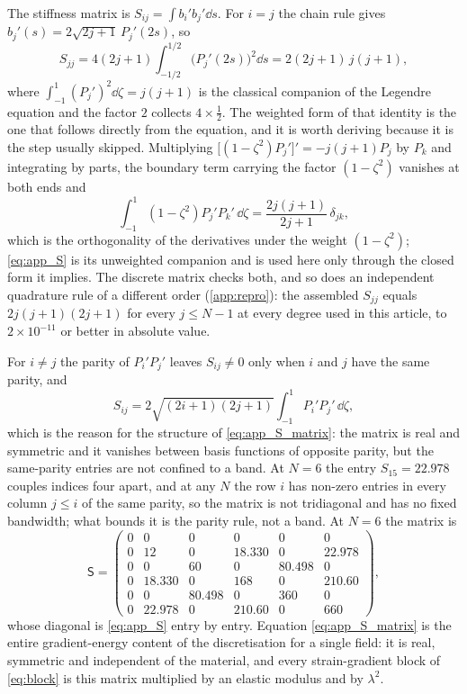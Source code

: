 The stiffness matrix is $S_{ij}=\int b_i'b_j'\dd s$.  For $i=j$ the chain rule
gives $b_j'(s)=2\sqrt{2j+1}\,P_j'(2s)$, so
\begin{equation}
\label{eq:app_S}
S_{jj}=4(2j+1)\int_{-1/2}^{1/2}\bigl(P_j'(2s)\bigr)^{2}\dd s
=2(2j+1)\,j(j+1),
\end{equation}
where $\int_{-1}^{1}(P_j')^{2}\dd\zeta=j(j+1)$ is the classical companion of the
Legendre equation and the factor $2$ collects $4\times\tfrac12$.  The weighted
form of that identity is the one that follows directly from the equation, and it
is worth deriving because it is the step usually skipped.  Multiplying
$\bigl[(1-\zeta^{2})P_j'\bigr]'=-j(j+1)P_j$ by $P_k$ and integrating by parts, the
boundary term carrying the factor $(1-\zeta^{2})$ vanishes at both ends and
\begin{equation}
\label{eq:app_S_weighted}
\int_{-1}^{1}(1-\zeta^{2})P_j'P_k'\,\dd\zeta
=\frac{2j(j+1)}{2j+1}\,\delta_{jk},
\end{equation}
which is the orthogonality of the derivatives under the weight
$(1-\zeta^{2})$; \eqref{eq:app_S} is its unweighted companion and is used here
only through the closed form it implies.  The discrete matrix checks both, and so
does an independent quadrature rule of a different order
(\cref{app:repro}): the assembled $S_{jj}$ equals $2j(j+1)(2j+1)$ for every
$j\le N-1$ at every degree used in this article, to $2\times10^{-11}$ or better
in absolute value.

For $i\neq j$ the parity of $P_i'P_j'$ leaves $S_{ij}\neq0$ only when $i$ and $j$
have the same parity, and
\begin{equation}
\label{eq:app_S_off}
S_{ij}=2\sqrt{(2i+1)(2j+1)}\int_{-1}^{1}P_i'P_j'\,\dd\zeta ,
\end{equation}
which is the reason for the structure of \eqref{eq:app_S_matrix}: the matrix is
real and symmetric and it vanishes between basis functions of opposite parity,
but the same-parity entries are not confined to a band.  At $N=6$ the entry
$S_{15}=22.978$ couples indices four apart, and at any $N$ the row $i$ has
non-zero entries in every column $j\le i$ of the same parity, so the matrix is
not tridiagonal and has no fixed bandwidth; what bounds it is the parity rule,
not a band.  At $N=6$ the matrix is
\begin{equation}
\label{eq:app_S_matrix}
\mathsf S=
\begin{pmatrix}
0&0&0&0&0&0\\
0&12&0&18.330&0&22.978\\
0&0&60&0&80.498&0\\
0&18.330&0&168&0&210.60\\
0&0&80.498&0&360&0\\
0&22.978&0&210.60&0&660
\end{pmatrix},
\end{equation}
whose diagonal is \eqref{eq:app_S} entry by entry.  Equation
\eqref{eq:app_S_matrix} is the entire gradient-energy content of the
discretisation for a single field: it is real, symmetric and independent of the
material, and every strain-gradient block of \eqref{eq:block} is this matrix
multiplied by an elastic modulus and by $\lambda^{2}$.

